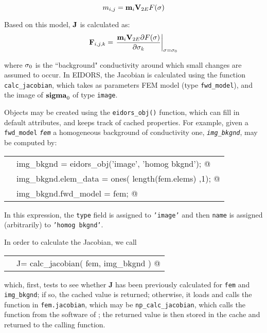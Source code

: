 \documentclass[12pt]{iopart}
\makeatletter
\newcommand{\CN}{\tt\small} %
\newcommand{\CC}{&\verb@}   % start code
\makeatother
\begin{document}
\begin{equation}
m_{i,j} = {\bf m}_{i} {\bf V}_{2E} F({\bf \sigma})
\end{equation}

Based on this model, $\bf J$ is calculated as:
\begin{equation}
{\bf F}_{i,j,k} = \left.\frac{
 {\bf m}_{i} {\bf V}_{2E}{\partial}F({\bf \sigma})
}{
{\partial}{\bf \sigma}_k
}
\right|_{
   {\bf \sigma} = {\bf \sigma}_0 
}
\end{equation}

where ${\bf \sigma}_0$ is the ``background"
conductivity around which small changes are assumed to occur.
In EIDORS, the Jacobian is calculated using the function
{\tt calc\_jacobian},
which takes as parameters FEM model (type {\tt fwd\_model}),
and the image of ${\bf sigma}_0$ 
of type {\tt image}.

Objects may be created using the {\tt eidors\_obj()}
function, which can fill in default attributes, and 
keeps track of cached properties.
For example, given a {\tt fwd\_model} {\tt\em fem}
a homogeneous background of conductivity one,
{\tt\em img\_bkgnd}, may be computed by:

\begin{tabular}{ll}
\CN    \CC img_bkgnd           = eidors_obj('image', 'homog bkgnd'); @\\
\CN    \CC img_bkgnd.elem_data = ones( length(fem.elems) ,1); @\\
\CN    \CC img_bkgnd.fwd_model = fem; @\\
\end{tabular}

In this expression, the {\tt type} field is assigned
to {\tt 'image'} and then {\tt name} is assigned
(arbitrarily) to {\tt 'homog bkgnd'}.

In order to calculate the Jacobian, we call

\begin{tabular}{ll}
\CN    \CC J= calc_jacobian( fem, img_bkgnd ) @\\
\end{tabular}

which, first, tests to see whether {\bf J} has been previously
calculated for {\tt fem} and {\tt img\_bkgnd}; if
so, the cached value is returned; otherwise,
it loads and calls the function in {\tt fem.jacobian},
which may be {\tt np\_calc\_jacobian}, which 
calls the function from the software of
\cite{Polydorides_and_Lionheart_2002}; the returned
value is then stored in the cache and returned to the
calling function.
\end{document}
